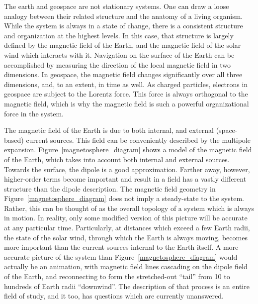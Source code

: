 The earth and geospace are not stationary systems. One can draw a loose analogy between their related structure and the anatomy of a living organism. While the system is always in a state of change, there is a consistent structure and organization at the highest levels. In this case, that structure is largely defined by the magnetic field of the Earth, and the magnetic field of the solar wind which interacts with it. Navigation on the surface of the Earth can be accomplished by measuring the direction of the local magnetic field in two dimensions. In geospace, the magnetic field changes significantly over all three dimensions, and, to an extent, in time as well. As charged particles, electrons in geospace are subject to the Lorentz force. This force is always orthogonal to the magnetic field, which is why the magnetic field is such a powerful organizational force in the system. 

The magnetic field of the Earth is due to both internal, and external (space-based) current sources. This field can be conveniently described by the multipole expansion. Figure~\ref{magnetosphere_diagram} shows a model of the magnetic field of the Earth, which takes into account both internal and external sources. Towards the surface, the dipole is a good approximation. Farther away, however, higher-order terms become important and result in a field has a vastly different structure than the dipole description. The magnetic field geometry in Figure~\ref{magnetosphere_diagram} does not imply a steady-state to the system. Rather, this can be thought of as the overall topology of a system which is always in motion. In reality, only some modified version of this picture will be accurate at any particular time. Particularly, at distances which exceed a few Earth radii, the state of the solar wind, through which the Earth is always moving, becomes more important than the current sources internal to the Earth itself. A more accurate picture of the system than Figure~\ref{magnetosphere_diagram} would actually be an animation, with magnetic field lines cascading on the dipole field of the Earth, and reconnecting to form the stretched-out ``tail'' from 10 to hundreds of Earth radii ``downwind''. The description of that process is an entire field of study, and it too, has questions which are currently unanswered.

